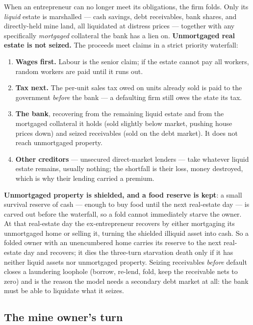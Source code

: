 \documentclass[11pt]{article}
\begin{document}
When an entrepreneur can no longer meet its obligations, the firm folds. Only its
\emph{liquid} estate is marshalled --- cash savings, debt receivables, bank
shares, and directly-held mine land, all liquidated at distress prices ---
together with any specifically \emph{mortgaged} collateral the bank has a lien
on. \textbf{Unmortgaged real estate is not seized.} The proceeds meet claims in a
strict priority waterfall:

\begin{enumerate}
  \item \textbf{Wages first.} Labour is the senior claim; if the estate cannot
  pay all workers, random workers are paid until it runs out.
  \item \textbf{Tax next.} The per-unit sales tax owed on units already sold is
  paid to the government \emph{before} the bank --- a defaulting firm still owes
  the state its tax.
  \item \textbf{The bank}, recovering from the remaining liquid estate and from
  the mortgaged collateral it holds (sold slightly below market, pushing house
  prices down) and seized receivables (sold on the debt market). It does not
  reach unmortgaged property.
  \item \textbf{Other creditors} --- unsecured direct-market lenders --- take
  whatever liquid estate remains, usually nothing; the shortfall is their loss,
  money destroyed, which is why their lending carried a premium.
\end{enumerate}

\noindent\textbf{Unmortgaged property is shielded, and a food reserve is kept}:
a small survival reserve of cash --- enough to buy food until the next
real-estate day --- is carved out before the waterfall, so a fold cannot
immediately starve the owner. At that real-estate day the ex-entrepreneur
recovers by either mortgaging its unmortgaged home or selling it, turning the
shielded illiquid asset into cash. So a folded owner with an unencumbered home
carries its reserve to the next real-estate day and recovers; it dies the
three-turn starvation death only if it has neither liquid assets nor unmortgaged
property. Seizing receivables \emph{before} default closes a
laundering loophole (borrow, re-lend, fold, keep the receivable nets to zero) and
is the reason the model needs a secondary debt market at all: the bank must be
able to liquidate what it seizes.

\subsection{The mine owner's turn}
\end{document}
